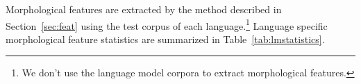 Morphological features are extracted by the method described in
Section~\ref{sec:feat} using the test corpus of each
language.\footnote{We don't use the language model corpora to extract
  morphological features.}  Language specific morphological feature
statistics are summarized in Table~\ref{tab:lmstatistics}.

